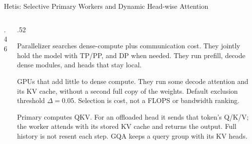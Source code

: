 \begin{frame}[t,label=main_hetis_arch]{Hetis: Selective Primary Workers and Dynamic Head-wise Attention}
\begin{columns}[T,onlytextwidth]
\begin{column}{.46\textwidth}
\end{column}
\begin{column}{.52\textwidth}
{\footnotesize
\textbf{}\par
Parallelizer searches dense-compute plus communication cost. They jointly hold the model with TP/PP, and DP when needed. They run prefill, decode dense modules, and heads that stay local.\par
\vspace{.01cm}
\textbf{}\par
GPUs that add little to dense compute. They run some decode attention and its KV cache, without a second full copy of the weights. Default exclusion threshold $\Delta=0.05$. Selection is cost, not a FLOPS or bandwidth ranking.\par
\vspace{.01cm}
\textbf{}\par
Primary computes QKV. For an offloaded head it sends that token's Q/K/V; the worker attends with its stored KV cache and returns the output. Full history is not resent each step. GQA keeps a query group with its KV heads.\par}
\end{column}
\end{columns}
\vspace{.00cm}
\end{frame}

